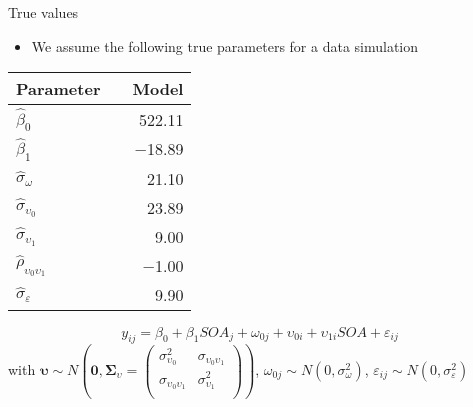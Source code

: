 \documentclass{beamer}
\newcommand{\gvect}[1]{\boldsymbol{#1}}
\newcommand{\gmat}[1]{\boldsymbol{#1}}
\begin{document}
\begin{frame}{True values}
  \begin{itemize}
    \item We assume the following true parameters for a data simulation
  \end{itemize}
  \begin{center}
  \begin{tabular}{lrr}
    \hline
    Parameter && Model \\
    \hline
    $\hat\beta_0$                     && 522.11\\
    $\hat\beta_1$                     && $-$18.89\\
    $\hat\sigma_{\omega}$             && 21.10\\
    $\hat\sigma_{\upsilon_0}$         && 23.89\\
    $\hat\sigma_{\upsilon_1}$         && 9.00\\
    $\hat\rho_{\upsilon_0\upsilon_1}$ && $-$1.00\\
    $\hat\sigma_{\varepsilon}$        && 9.90\\
    \hline
  \end{tabular}
  \end{center}
     \[
       y_{ij} = \beta_0 + \beta_1 SOA_j + \omega_{0j} + \upsilon_{0i} +
       \upsilon_{1i} SOA + \varepsilon_{ij} 
  \]
\small
with $\gvect{\upsilon} \sim N\left(\gvect{0}, \gmat{\Sigma}_{\upsilon} = 
    \begin{pmatrix}
      \sigma^2_{\upsilon_0} & \sigma_{\upsilon_0\upsilon_1} \\
      \sigma_{\upsilon_0\upsilon_1} & \sigma^2_{\upsilon_1} \\
    \end{pmatrix}\right)$,
  $\omega_{0j} \sim N(0, \sigma_{\omega}^2)$, $\varepsilon_{ij} \sim N(0,
  \sigma_{\varepsilon}^2)$ 
\end{frame}
\end{document}
